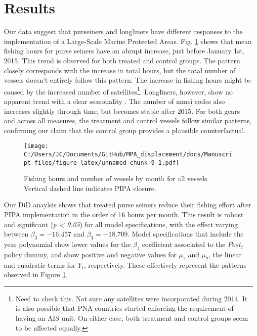 \documentclass[12pt,]{article}
\let\rmarkdownfootnote\footnote%
\def\footnote{\protect\rmarkdownfootnote}
\begin{document}
\clearpage

\section{Results}\label{results}

Our data suggest that purseiners and longliners have different responses
to the implementation of a Large-Scale Marine Protected Areas. Fig.
\ref{fig:all_vessels} shows that mean fishing hours for purse seiners
have an abrupt increase, just before January 1st, 2015. This trend is
observed for both treated and control groups. The pattern closely
corresponds with the increase in total hours, but the total number of
vessels doesn't entirely follow this pattern. The increase in fishing
hours might be caused by the increased number of satellites\footnote{Need
  to check this. Not sure any satellites were incorporated during 2014.
  It is also possible that PNA countries started enforcing the
  requirement of having an AIS unit. On either case, both treatment and
  control groups seem to be affected equally.}. Longliners, however,
show no apparent trend with a clear seasonality
\citep{ortuocrespo_2018}. The number of mmsi codes also increases
slightly through time, but becomes stable after 2015. For both gears and
across all measures, the treatment and control vessels follow similar
patterns, confirming our claim that the control group provides a
plausible counterfactual.

\begin{figure}
\centering
\texttt{[image: C:/Users/JC/Documents/GitHub/MPA\_displacement/docs/Manuscript\_files/figure-latex/unnamed-chunk-9-1.pdf]}
\caption{\label{fig:unnamed-chunk-9}\label{fig:all_vessels}Fishing hours and
number of vessels by month for all vessels. Vertical dashed line
indicates PIPA closure.}
\end{figure}

Our DiD anaylsis shows that treated purse seiners reduce their fishing
effort after PIPA implementation in the order of 16 hours per month.
This result is robust and significant (\emph{p \textless{} 0.05}) for
all model specifications, with the effect varying between
\(\beta_3 = -16.457\) and \(\beta_3 = -18.709\). Model specifications
that include the year polynomial show lower values for the \(\beta_1\)
coefficient associated to the \(Post_t\) policy dummy, and show positive
and negative values for \(\mu_1\) and \(\mu_2\), the linear and
cuadratic terms for \(Y_t\), respectively. These effectively represent
the patterns observed in Figure \ref{fig:all_vessels}.
\end{document}
